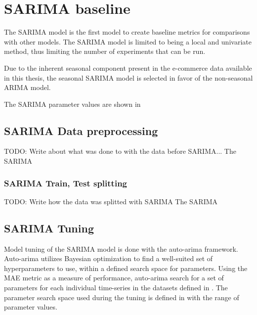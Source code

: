 
\section{SARIMA baseline}
\label{section:Method:SARIMA}

The SARIMA model is the first model to create baseline metrics for comparisons with other models.
The SARIMA model is limited to being a local and univariate method,
thus limiting the number of experiments that can be run.

Due to the inherent seasonal component present in the e-commerce data available in this thesis,
the seasonal SARIMA model is selected in favor of the non-seasonal ARIMA model.

The SARIMA parameter values are shown in

\subsection{SARIMA Data preprocessing}
TODO: Write about what was done to with the data before SARIMA...
The SARIMA
\subsubsection{SARIMA Train, Test splitting}
TODO: Write how the data was splitted with SARIMA
The SARIMA

\subsection{SARIMA Tuning}
Model tuning of the SARIMA model is done with the auto-arima framework.
Auto-arima utilizes Bayesian optimization to find a well-suited set of hyperparameters to use,
within a defined search space for parameters.
Using the MAE metric as a measure of performance, auto-arima search for a set of parameters for each individual time-series
in the datasets defined in .
The parameter search space used during the tuning is defined in  with the range of parameter values.

